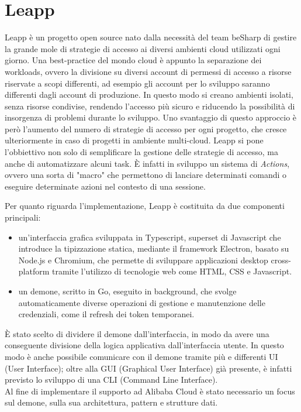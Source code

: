 \documentclass[a4paper]{article}
\begin{document}
\section{Leapp}
Leapp è un progetto open source nato dalla necessità del team beSharp di gestire la grande mole di strategie di accesso ai diversi ambienti cloud utilizzati ogni giorno. Una best-practice del mondo cloud è appunto la separazione dei workloads, ovvero la divisione su diversi account di permessi di accesso a risorse riservate a scopi differenti, ad esempio gli account per lo sviluppo saranno differenti dagli account di produzione. In questo modo si creano ambienti isolati, senza risorse condivise, rendendo l'accesso più sicuro e riducendo la possibilità di insorgenza di problemi durante lo sviluppo. Uno svantaggio di questo approccio è però l'aumento del numero di strategie di accesso per ogni progetto, che cresce ulteriormente in caso di progetti in ambiente multi-cloud. Leapp si pone l'obbiettivo non solo di semplificare la gestione delle strategie di accesso, ma anche di automatizzare alcuni task. È infatti in sviluppo un sistema di \textit{Actions}, ovvero una sorta di "macro" che permettono di lanciare determinati comandi o eseguire determinate azioni nel contesto di una sessione.

Per quanto riguarda l'implementazione, Leapp è costituita da due componenti principali:
\begin{itemize}
    \item un'interfaccia grafica sviluppata in Typescript, superset di Javascript che introduce la tipizzazione statica, mediante il framework Electron, basato su Node.js e Chromium, che permette di sviluppare applicazioni desktop cross-platform tramite l'utilizzo di tecnologie web come HTML, CSS e Javascript.
    
    \item un demone, scritto in Go, eseguito in background, che svolge automaticamente diverse operazioni di gestione e manutenzione delle credenziali, come il refresh dei token temporanei.
\end{itemize}
È stato scelto di dividere il demone dall'interfaccia,  in modo da avere una conseguente divisione della logica applicativa dall'interfaccia utente. In questo modo è anche possibile comunicare con il demone tramite più e differenti UI (User Interface); oltre alla GUI (Graphical User Interface) già presente, è infatti previsto lo sviluppo di una CLI (Command Line Interface).
\\
Al fine di implementare il supporto ad Alibaba Cloud è stato necessario un focus sul demone, sulla sua architettura, pattern e strutture dati.
\end{document}
